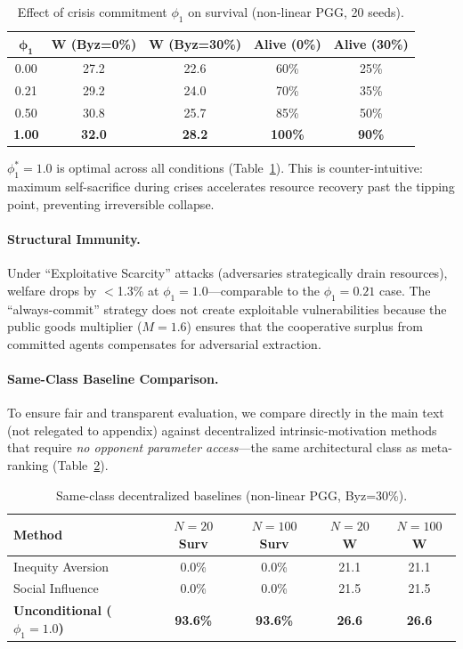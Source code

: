 \documentclass{article}
\begin{document}
\begin{table}[t]
\centering
\caption{Effect of crisis commitment $\phi_1$ on survival (non-linear PGG, 20 seeds).}
\label{tab:phi1}
\begin{tabular}{ccccc}
\toprule
$\boldsymbol{\phi_1}$ & \textbf{W (Byz=0\%)} & \textbf{W (Byz=30\%)} & \textbf{Alive (0\%)} & \textbf{Alive (30\%)} \\
\midrule
0.00 & 27.2 & 22.6 & 60\% & 25\% \\
0.21 & 29.2 & 24.0 & 70\% & 35\% \\
0.50 & 30.8 & 25.7 & 85\% & 50\% \\
\textbf{1.00} & \textbf{32.0} & \textbf{28.2} & \textbf{100\%} & \textbf{90\%} \\
\bottomrule
\end{tabular}
\end{table}

$\phi_1^* = 1.0$ is optimal across all conditions (Table~\ref{tab:phi1}).
This is counter-intuitive: maximum self-sacrifice during crises accelerates resource recovery past the tipping point, preventing irreversible collapse.

\paragraph{Structural Immunity.}
Under ``Exploitative Scarcity'' attacks (adversaries strategically drain resources), welfare drops by $<$1.3\% at $\phi_1 = 1.0$---comparable to the $\phi_1 = 0.21$ case.
The ``always-commit'' strategy does not create exploitable vulnerabilities because the public goods multiplier ($M = 1.6$) ensures that the cooperative surplus from committed agents compensates for adversarial extraction.

\paragraph{Same-Class Baseline Comparison.}
To ensure fair and transparent evaluation, we compare directly in the main text (not relegated to appendix) against decentralized intrinsic-motivation methods that require \emph{no opponent parameter access}---the same architectural class as meta-ranking (Table~\ref{tab:baselines}).

\begin{table}[t]
\centering
\caption{Same-class decentralized baselines (non-linear PGG, Byz=30\%).}
\label{tab:baselines}
\begin{tabular}{lcccc}
\toprule
\textbf{Method} & \textbf{$N{=}20$ Surv} & \textbf{$N{=}100$ Surv} & \textbf{$N{=}20$ W} & \textbf{$N{=}100$ W} \\
\midrule
Inequity Aversion & 0.0\% & 0.0\% & 21.1 & 21.1 \\
Social Influence & 0.0\% & 0.0\% & 21.5 & 21.5 \\
\midrule
\textbf{Unconditional ($\phi_1{=}1.0$)} & \textbf{93.6\%} & \textbf{93.6\%} & \textbf{26.6} & \textbf{26.6} \\
\bottomrule
\end{tabular}
\end{table}
\end{document}
